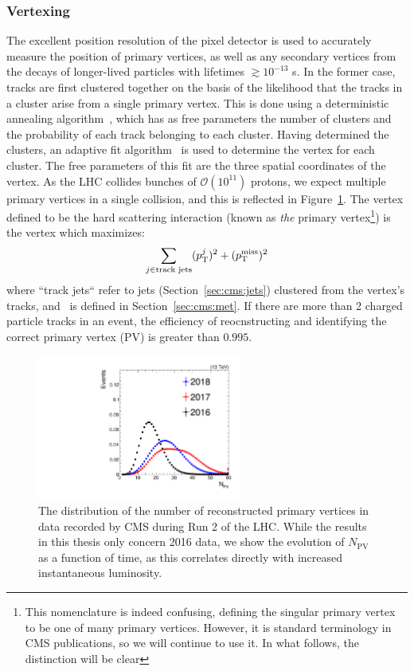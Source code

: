 \subsubsection{Vertexing}

The excellent position resolution of the pixel detector is used to accurately measure the position of primary vertices, as well as any secondary vertices from the decays of longer-lived particles with lifetimes $\gtrsim 10^{-13}$ s.
In the former case, tracks are first clustered together on the basis of the likelihood that the tracks in a cluster arise from a single primary vertex.
This is done using a deterministic annealing algorithm~\cite{da}, which has as free parameters the number of clusters and the probability of each track belonging to each cluster.
Having determined the clusters, an adaptive fit algorithm~\cite{adaptivefit} is used to determine the vertex for each cluster.
The free parameters of this fit are the three spatial coordinates of the vertex.
As the LHC collides bunches of $\mathcal{O}(10^{11})$ protons, we expect multiple primary vertices in a single collision, and this is reflected in Figure~\ref{fig:cms:npv}.
The vertex defined to be the hard scattering interaction (known as \emph{the} primary vertex\footnote{This nomenclature is indeed confusing, defining the singular primary vertex to be one of many primary vertices. However, it is standard terminology in CMS publications, so we will continue to use it. In what follows, the distinction will be clear}) is the vertex which maximizes:
\begin{equation}
    \sum_{j\in\text{track jets}} (p_\mathrm{T}^j)^2 + (p_\mathrm{T}^\mathrm{miss})^2
\end{equation}
where ``track jets`` refer to jets (Section~\ref{sec:cms:jets}) clustered from the vertex's tracks, and \ptmiss~is defined in Section~\ref{sec:cms:met}.
If there are more than 2 charged particle tracks in an event, the efficiency of reocnstructing and identifying the correct primary vertex (PV) is greater than $0.995$.

\begin{figure}[]
    \begin{center} 
        \includegraphics[width=0.6\textwidth]{figures/cms/comparison_npv.pdf}
        \caption{The distribution of the number of reconstructed primary vertices in data recorded by CMS during Run 2 of the LHC.
                 While the results in this thesis only concern 2016 data, we show the evolution of $N_\mathrm{PV}$ as a function of time, as this correlates directly with increased instantaneous luminosity.}
        \label{fig:cms:npv}
    \end{center}
\end{figure}

